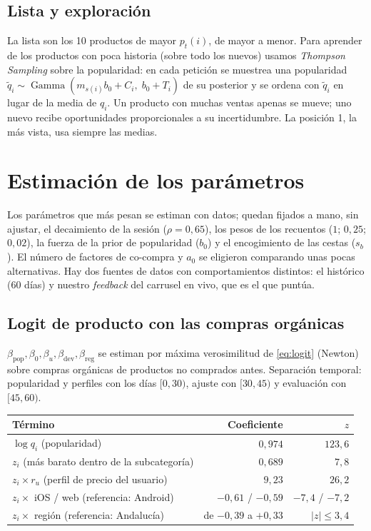 \documentclass[11pt,a4paper]{article}
\newcommand{\Gam}{\operatorname{Gamma}}
\begin{document}
\subsection{Lista y exploración}

La lista son los 10 productos de mayor $p_t(i)$, de mayor a menor. Para aprender de los productos
con poca historia (sobre todo los nuevos) usamos \emph{Thompson Sampling} sobre la popularidad: en cada
petición se muestrea una popularidad $\tilde q_i\sim\Gam(m_{s(i)}b_0+C_i,\;b_0+T_i)$ de su posterior y se
ordena con $\tilde q_i$ en lugar de la media de $q_i$. Un producto con muchas ventas apenas se mueve; uno nuevo recibe oportunidades proporcionales
a su incertidumbre. La posición 1, la más vista, usa siempre las medias.

\section{Estimación de los parámetros}

Los parámetros que más pesan se estiman con datos; quedan fijados a mano, sin ajustar, el decaimiento de la
sesión ($\rho=0{,}65$), los pesos de los recuentos ($1$; $0{,}25$; $0{,}02$), la fuerza de la prior de
popularidad ($b_0$) y el encogimiento de las cestas ($s_b$). El número de factores de co-compra y $a_0$ se
eligieron comparando unas pocas alternativas. Hay dos fuentes de datos con comportamientos distintos:
el histórico (60 días) y nuestro \emph{feedback} del carrusel en vivo, que es el que puntúa.

\subsection{Logit de producto con las compras orgánicas}

$\beta_{\text{pop}},\beta_0,\beta_u,\beta_{\text{dev}},\beta_{\text{reg}}$ se estiman por máxima
verosimilitud de \eqref{eq:logit} (Newton) sobre compras orgánicas de productos no comprados antes.
Separación temporal: popularidad y perfiles con los días $[0,30)$, ajuste con $[30,45)$ y evaluación
con $[45,60)$.

\begin{center}
\begin{tabular}{lrr}
\toprule
Término & Coeficiente & $z$\\
\midrule
$\log q_i$ (popularidad) & $0{,}974$ & $123{,}6$\\
$z_i$ (más barato dentro de la subcategoría) & $0{,}689$ & $7{,}8$\\
$z_i\times r_u$ (perfil de precio del usuario) & $9{,}23$ & $26{,}2$\\
$z_i\times$ iOS \;/\; web (referencia: Android) & $-0{,}61$ \;/\; $-0{,}59$ & $-7{,}4$ \;/\; $-7{,}2$\\
$z_i\times$ región (referencia: Andalucía) & de $-0{,}39$ a $+0{,}33$ & $|z|\le 3{,}4$\\
\bottomrule
\end{tabular}
\end{center}
\end{document}
